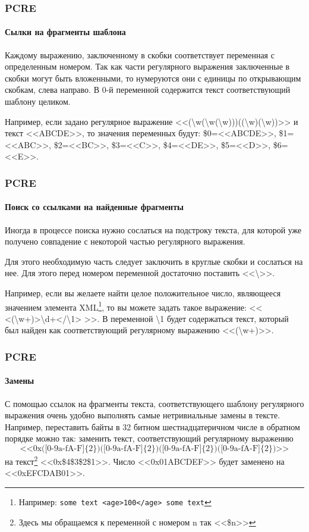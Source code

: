 \begin{frame}
    \frametitle{PCRE}
    \framesubtitle{Сылки на фрагменты шаблона}
    
    Каждому выражению, заключенному в скобки соответствует переменная с определенным номером. Так как части регулярного выражения заключенные в скобки могут быть вложенными, то нумеруются они с единицы по открывающим скобкам, слева направо. В 0-й переменной содержится текст соответствующий шаблону целиком.
    
    Например, если задано регулярное выражение <<(\textbackslash w(\textbackslash w(\textbackslash w)))((\textbackslash w)(\textbackslash w))>> и текст <<ABCDE>>, то значения переменных будут: \$0=<<ABCDE>>, \$1=<<ABC>>, \$2=<<BC>>, \$3=<<C>>, \$4=<<DE>>, \$5=<<D>>, \$6=<<E>>. 
\end{frame}

\begin{frame}[fragile]
    \frametitle{PCRE}
    \framesubtitle{Поиск со ссылками на найденные фрагменты}
    
    Иногда в процессе поиска нужно сослаться на подстроку текста, для которой уже получено совпадение с некоторой частью регулярного выражения. 
    
    Для этого необходимую часть следует заключить в круглые скобки и сослаться на нее. Для этого перед номером переменной достаточно поставить <<\textbackslash>>. 
    
    Например, если вы желаете найти целое положительное число, являющееся значением элемента XML\footnote{Например: \verb"some text <age>100</age> some text"}, то вы можете задать такое выражение: << <(\textbackslash w+)>\textbackslash d+</\textbackslash 1> >>. В переменной \textbackslash 1 будет содержаться текст, который был найден как соответствующий регулярному выражению <<(\textbackslash w+)>>.    
\end{frame}

\begin{frame}
    \frametitle{PCRE}
    \framesubtitle{Замены}
    
    С помощью ссылок на фрагменты текста, соответствующего шаблону регулярного выражения очень удобно выполнять самые нетривиальные замены в тексте. Например, переставить байты в 32 битном шестнадцатеричном числе в обратном порядке можно так: заменить текст, соответствующий регулярному выражению 
    \[
    \text{<<0x([0-9a-fA-F]\{2\})([0-9a-fA-F]\{2\})([0-9a-fA-F]\{2\})([0-9a-fA-F]\{2\})>>}
    \]
    на текст\footnote{Здесь мы обращаемся к переменной с номером n так <<\$n>>} <<0x\$4\$3\$2\$1>>. Число <<0x01ABCDEF>> будет заменено на <<0xEFCDAB01>>.
\end{frame}
    
